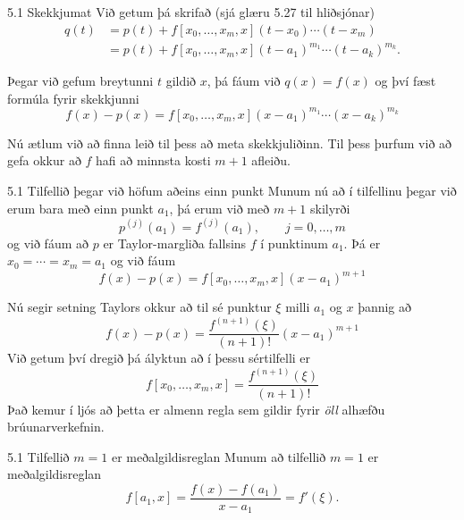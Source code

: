 \begin{frame}{5.1 Skekkjumat} 
Við getum þá skrifað (sjá glæru 5.27 til hliðsjónar)
\begin{align*}
  q(t) &= p(t) + f[x_0,\ldots,x_m,x](t-x_0)\cdots(t-x_m) \\
  &= p(t) + f[x_0,\ldots,x_m,x](t-a_1)^{m_1}\cdots(t-a_k)^{m_k}.
\end{align*}

\pause
Þegar við gefum breytunni $t$ gildið $x$, þá fáum við $q(x) = f(x)$
og  því fæst formúla fyrir skekkjunni
\begin{equation*}
  f(x) - p(x) 
  = f[x_0,\ldots,x_m,x](x-a_1)^{m_1}\cdots(x-a_k)^{m_k}
\end{equation*} 

\pause
Nú ætlum við að finna leið til þess að meta skekkjuliðinn. 
Til þess þurfum við að gefa okkur að $f$ hafi að minnsta kosti 
$m+1$ afleiðu.
\end{frame}

\begin{frame}{5.1 Tilfellið þegar við höfum aðeins einn punkt} 
Munum nú að í tilfellinu þegar við erum bara með einn punkt 
$a_1$, þá erum við með $m+1$ skilyrði 
$$p^{(j)}(a_1)=f^{(j)}(a_1), \qquad j=0,\dots,m
$$
og við fáum að $p$ er Taylor-margliða fallsins $f$ í punktinum $a_1$.
Þá er $x_0=\cdots=x_m=a_1$ og við fáum
\begin{equation*}
  f(x) - p(x) 
  = f[x_0,\ldots,x_m,x](x-a_1)^{m+1}
\end{equation*} 

\pause
Nú segir setning Taylors okkur að til sé punktur $\xi$ milli $a_1$ og
$x$ þannig að 
$$
  f(x) - p(x) 
  = \dfrac{f^{(n+1)}(\xi)}{(n+1)!}(x-a_1)^{m+1}
$$
Við getum því dregið þá ályktun að í þessu sértilfelli er
$$
f[x_0,\ldots,x_m,x]=\dfrac{f^{(n+1)}(\xi)}{(n+1)!}
$$
Það kemur í ljós að þetta er almenn regla sem gildir
fyrir {\it öll} alhæfðu brúunarverkefnin.
\end{frame}

\begin{frame}{5.1 Tilfellið $m=1$ er meðalgildisreglan} 
Munum að tilfellið $m=1$ er meðalgildisreglan
$$
f[a_1,x]=\dfrac{f(x)-f(a_1)}{x-a_1}=f'(\xi).
$$
\end{frame}


